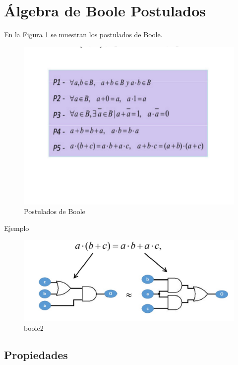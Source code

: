 \documentclass[12pt,letterpaper]{book}
\begin{document}
\section{Álgebra de Boole Postulados}

En la Figura \ref{proBoo} se muestran los postulados de Boole. 

\begin{figure}[H]
\centering
\includegraphics[width=1\linewidth]{figures/proBoo.png}
\caption{Postulados de Boole}
\label{proBoo}
\end{figure}
\vspace{0.2cm}

Ejemplo

\begin{figure}[H]
\centering
\includegraphics[width=1\linewidth]{figures/boole2.png}
\caption{boole2 \cite{Beltran}}
\label{}
\end{figure}
\vspace{0.2cm}

\subsection{Propiedades}
\end{document}
